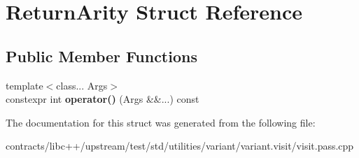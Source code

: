 \hypertarget{struct_return_arity}{}\section{Return\+Arity Struct Reference}
\label{struct_return_arity}
\subsection*{Public Member Functions}
\begin{DoxyCompactItemize}
\item 
\mbox{\label{struct_return_arity_a4cebec065aea295b0c9fbbd68b5a00f0}} 
{\footnotesize template$<$class... Args$>$ }\\constexpr int {\bfseries operator()} (Args \&\&...) const
\end{DoxyCompactItemize}


The documentation for this struct was generated from the following file\+:\begin{DoxyCompactItemize}
\item 
contracts/libc++/upstream/test/std/utilities/variant/variant.\+visit/visit.\+pass.\+cpp\end{DoxyCompactItemize}
